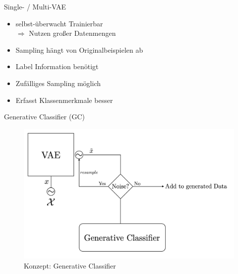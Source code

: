 \documentclass[10pt, compress]{beamer}
\begin{document}
\begin{frame}{Single- / Multi-VAE}
\begin{minipage}[c]{.50\textwidth}
\end{minipage}\hfill
\begin{minipage}[c]{.45\textwidth}
\end{minipage}
\vfill
\begin{minipage}[c]{.50\textwidth}
  \begin{itemize}
    \item selbst-überwacht Trainierbar\\
      $\Rightarrow$ Nutzen großer Datenmengen
    \item Sampling hängt von Originalbeispielen ab
  \end{itemize}
\end{minipage}\hfill
\begin{minipage}[c]{.45\textwidth}
  \begin{itemize}
    \item Label Information benötigt
    \item Zufälliges Sampling möglich
    \item Erfasst Klassenmerkmale besser
  \end{itemize}
\end{minipage}
\end{frame}

\begin{frame}{Generative Classifier (GC)}
\centering
\begin{minipage}[c]{.8\textwidth}
  \begin{figure}[hbt]
  \centering
  \includegraphics[width=\textwidth]{gfx/methodology/gc}
  \caption{Konzept: Generative Classifier}
  \end{figure}
\end{minipage}
\end{frame}
\end{document}
